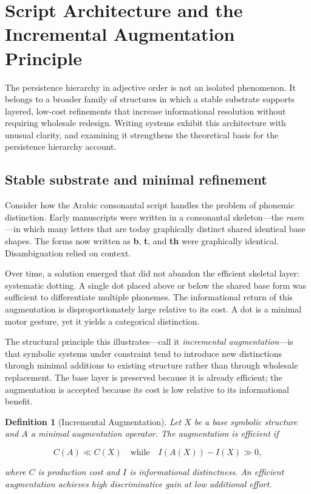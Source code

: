 \documentclass[11pt]{article}
\theoremstyle{rthm}
\theoremstyle{rdef}
\newtheorem{definition}[theorem]{Definition}
\theoremstyle{remark}
\begin{document}
\section{Script Architecture and the Incremental Augmentation Principle}
\label{sec:script}

The persistence hierarchy in adjective order is not an isolated phenomenon.
It belongs to a broader family of structures in which a stable substrate
supports layered, low-cost refinements that increase informational resolution
without requiring wholesale redesign. Writing systems exhibit this architecture
with unusual clarity, and examining it strengthens the theoretical basis for
the persistence hierarchy account.

\subsection{Stable substrate and minimal refinement}

Consider how the Arabic consonantal script handles the problem of phonemic
distinction. Early manuscripts were written in a consonantal skeleton---the
\textit{rasm}---in which many letters that are today graphically distinct
shared identical base shapes. The forms now written as \textbf{b}, \textbf{t},
and \textbf{th} were graphically identical. Disambiguation relied on context.

Over time, a solution emerged that did not abandon the efficient skeletal
layer: systematic dotting. A single dot placed above or below the shared base
form was sufficient to differentiate multiple phonemes. The informational
return of this augmentation is disproportionately large relative to its cost.
A dot is a minimal motor gesture, yet it yields a categorical distinction.

The structural principle this illustrates---call it \emph{incremental
augmentation}---is that symbolic systems under constraint tend to introduce
new distinctions through minimal additions to existing structure rather than
through wholesale replacement. The base layer is preserved because it is
already efficient; the augmentation is accepted because its cost is low
relative to its informational benefit.

\begin{definition}[Incremental Augmentation]
\label{def:aug}
Let $X$ be a base symbolic structure and $A$ a minimal augmentation operator.
The augmentation is \emph{efficient} if

\[
C(A) \ll C(X)
\quad \text{while} \quad
I(A(X)) - I(X) \gg 0,
\]

where $C$ is production cost and $I$ is informational distinctness. An
efficient augmentation achieves high discriminative gain at low additional
effort.
\end{definition}
\end{document}

